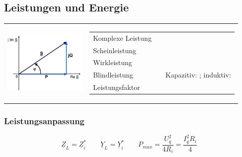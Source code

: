 \subsection{Leistungen und Energie}
	\begin{tabular}{ll}
   		\parbox{4cm}{
   			\includegraphics[width=4cm]{./images/zeigerdiag-leistungen.png}}
   		& \parbox{14cm}{
			\begin{tabular}{p{3cm}p{4.5cm}p{5.5cm}}
	      		\multirow{2}{4cm}{Komplexe Leistung}  &
	      			$ \underline{S} = P + jQ$  &\\
	      			& \multicolumn{2}{l}{$ \underline{S} = \underline{U} \cdot \underline{I}^\ast = U\cdot I \cdot e^{j(\varphi_u-\varphi_i)} = \frac{\underline{U}^2}{\underline{Z}^*} = \underline{I}^2 \cdot \underline{Z} = \underline{U}^2\cdot\underline{Y}^*$}\\
				Scheinleistung
					& $ S = | \underline{S} | = U I = \frac{U^2}{Z} = I^2 Z$ 
					& \\
				Wirkleistung
					& $ P = \Real(\underline{S}) = U I \cos(\varphi) $ \\
				Blindleistung 
					& $ Q = \Imag(\underline{S}) = U I \sin(\varphi) $
					& Kapazitiv: $Q < 0$; induktiv: $Q > 0$ \\
				Leistungsfaktor
					& $\cos \varphi = \frac{P}{S} = \frac{P}{UI}$ \\
			\end{tabular}}
   	\end{tabular}
\subsubsection{Leistungsanpassung}
	\begin{equation*}
		\boxed{\underline{Z}_L = \underline{Z}_i^{\ast}} \qquad \underline{Y}_L = \underline{Y}_i^{\ast} \qquad P_{max} = \frac{U_q^2}{4R_i} = \frac{I_q^2 R_i}{4} 
	\end{equation*}   	

